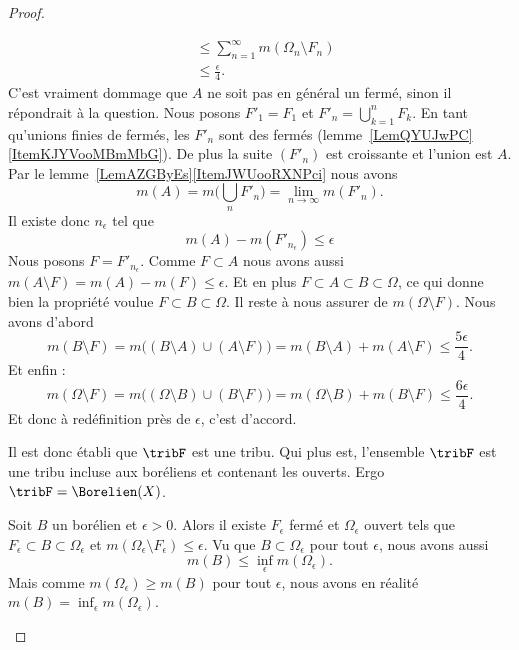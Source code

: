 \begin{proof}
\begin{subproof}
\begin{subproof}
\begin{subequations}
\begin{align}
					                & \leq \sum_{n=1}^{\infty}m(\Omega_n\setminus F_n) \\
					                & \leq \frac{ \epsilon }{ 4 }.
				\end{align}
			\end{subequations}
			C'est vraiment dommage que \( A\) ne soit pas en général un fermé, sinon il répondrait à la question. Nous posons \( F'_1=F_1\) et \( F'_n=\bigcup_{k=1}^nF_k\). En tant qu'unions finies de fermés, les \( F'_n\) sont des fermés (lemme~\ref{LemQYUJwPC}\ref{ItemKJYVooMBmMbG}). De plus la suite \( (F'_n)\)  est croissante et l'union est \( A\). Par le lemme~\ref{LemAZGByEs}\ref{ItemJWUooRXNPci} nous avons
			\begin{equation}
				m(A)=m\big( \bigcup_nF'_n \big)=\lim_{n\to \infty} m(F'_n).
			\end{equation}
			Il existe donc \( n_{\epsilon}\) tel que
			\begin{equation}
				m(A)-m(F'_{n_{\epsilon}})\leq \epsilon
			\end{equation}
			Nous posons \( F=F'_{n_{\epsilon}}\). Comme \( F\subset A\) nous avons aussi \( m(A\setminus F)=m(A)-m(F)\leq \epsilon\). Et en plus \( F\subset A\subset B\subset \Omega\), ce qui donne bien la propriété voulue \( F\subset B\subset \Omega\). Il reste à nous assurer de \( m(\Omega\setminus F)\). Nous avons d'abord
			\begin{equation}
				m(B\setminus F)=m\big( (B\setminus A)\cup (A\setminus F) \big)=m(B\setminus A)+m(A\setminus F)\leq \frac{ 5\epsilon }{ 4 }.
			\end{equation}
			Et enfin :
			\begin{equation}
				m(\Omega\setminus F)=m\big( (\Omega\setminus B)\cup (B\setminus F) \big)=m(\Omega\setminus B)+m(B\setminus F)\leq \frac{ 6\epsilon }{ 4 }.
			\end{equation}
			Et donc à redéfinition près de \( \epsilon\), c'est d'accord.
		\end{subproof}

		Il est donc établi que \( \tribF\) est une tribu. Qui plus est, l'ensemble \( \tribF\) est une tribu incluse aux boréliens et contenant les ouverts. Ergo \( \tribF=\Borelien(X)\).

		Soit \( B\) un borélien et \( \epsilon>0\). Alors il existe \( F_{\epsilon}\) fermé et \( \Omega_{\epsilon} \) ouvert tels que \( F_{\epsilon}\subset B\subset \Omega_{\epsilon}\) et \( m(\Omega_{\epsilon}\setminus F_{\epsilon})\leq \epsilon\). Vu que \( B\subset \Omega_{\epsilon}\) pour tout \( \epsilon\), nous avons aussi
		\begin{equation}
			m(B)\leq \inf_{\epsilon}m(\Omega_{\epsilon}).
		\end{equation}
		Mais comme \( m(\Omega_{\epsilon})\geq m(B)\) pour tout \( \epsilon\), nous avons en réalité \( m(B)=\inf_{\epsilon}m(\Omega_{\epsilon})\).


\end{subproof}
\end{proof}
